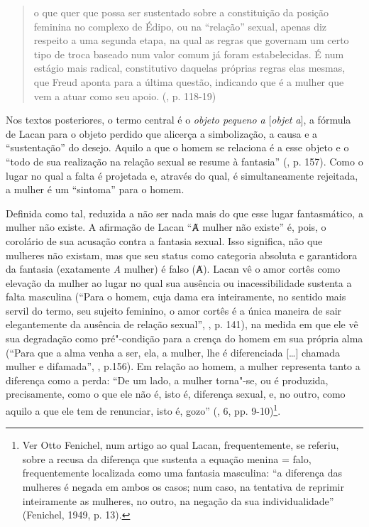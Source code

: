 \begin{quote}
o que quer que possa ser sustentado sobre a constituição da posição
feminina no complexo de Édipo, ou na ``relação'' sexual, apenas diz
respeito a uma segunda etapa, na qual as regras que governam um certo
tipo de troca baseado num valor comum já foram estabelecidas. É num
estágio mais radical, constitutivo daquelas próprias regras elas mesmas,
que Freud aponta para a última questão, indicando que é a mulher que vem
a atuar como seu apoio. (, p. 118-19)
\end{quote}

Nos textos posteriores, o termo central é o \emph{objeto pequeno a}
{[}\emph{objet a}{]}, a fórmula de Lacan para o objeto perdido que
alicerça a simbolização, a causa e a ``sustentação'' do desejo. Aquilo a
que o homem se relaciona é a esse objeto e o ``todo de sua realização na
relação sexual se resume à fantasia'' (, p. 157). Como o lugar
no qual a falta é projetada e, através do qual, é simultaneamente
rejeitada, a mulher é um ``sintoma'' para o homem.

Definida como tal, reduzida a não ser nada mais do que esse lugar
fantasmático, a mulher não existe. A afirmação de Lacan ``Ⱥ mulher não
existe'' é, pois, o corolário de sua acusação contra a fantasia sexual.
Isso significa, não que mulheres não existam, mas que seu status como
categoria absoluta e garantidora da fantasia (exatamente \emph{A}
mulher) é falso (Ⱥ). Lacan vê o amor cortês como elevação da mulher ao
lugar no qual sua ausência ou inacessibilidade sustenta a falta
masculina (``Para o homem, cuja dama era inteiramente, no sentido mais
servil do termo, seu sujeito feminino, o amor cortês é a única maneira
de sair elegantemente da ausência de relação sexual'', , p.
141), na medida em que ele vê sua degradação como pré"-condição para a
crença do homem em sua própria alma (``Para que a alma venha a ser, ela,
a mulher, lhe é diferenciada {[}\ldots{}{]} chamada mulher e difamada'',
, p.156). Em relação ao homem, a mulher representa tanto a
diferença como a perda: ``De um lado, a mulher torna"-se, ou é produzida,
precisamente, como o que ele não é, isto é, diferença sexual, e, no
outro, como aquilo a que ele tem de renunciar, isto é, gozo'' (,
6, pp. 9-10)\footnote{Ver Otto Fenichel, num artigo ao qual Lacan,
  frequentemente, se referiu, sobre a recusa da diferença que sustenta a
  equação menina = falo, frequentemente localizada como uma fantasia
  masculina: ``a diferença das mulheres é negada em ambos os casos; num
      caso, na tentativa de reprimir inteiramente as mulheres, no outro, na
      negação da sua individualidade'' (Fenichel, 1949, p. 13).}.

